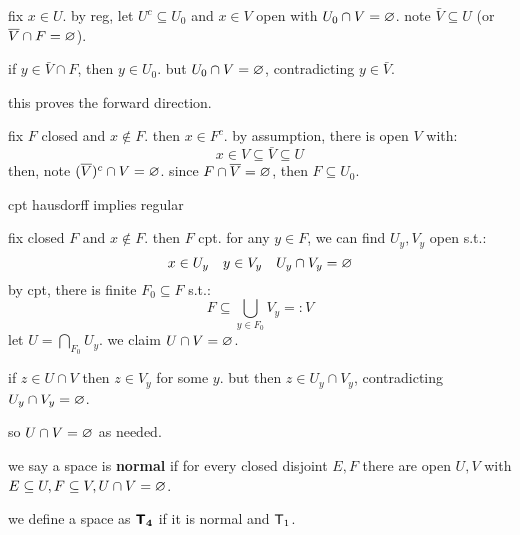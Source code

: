 \begin{pf}[source=Primary Source Material]
    fix $x\in U$.
    by reg, let $U^{c}\subseteq U_{0}$ and $x\in V$ open with
    $U_{0}\cap V=\varnothing$.
    note $\bar{V}\subseteq U$ (or $\overline{V}\cap F=\varnothing$).
    \begin{block}
        if $y\in\bar{V}\cap F$, then $y\in U_{0}$.
        but $U_{0}\cap V=\varnothing$, contradicting $y\in\bar{V}$.
    \end{block}
    this proves the forward direction.

    fix $F$ closed and $x\notin F$. then $x\in F^{c}$.
    by assumption, there is open $V$ with:
    \begin{equation*}
        x\in V\subseteq\bar{V}\subseteq U
    \end{equation*}
    then, note $(\overline{V})^{c}\cap V=\varnothing$.
    since $F\cap\overline{V}=\varnothing$, then $F\subseteq U_{0}$.
\end{pf}

\begin{prop}
    cpt hausdorff implies regular
\end{prop}

\begin{pf}[source=Primary Source Material]
    fix closed $F$ and $x\notin F$. then $F$ cpt.
    for any $y\in F$, we can find $U_{y},V_{y}$ open s.t.:
    \begin{equation*}
        x\in U_{y} \quad y\in V_{y} \quad U_{y}\cap V_{y}=\varnothing
    \end{equation*}
    by cpt, there is finite $F_{0}\subseteq F$ s.t.:
    \begin{equation*}
        F\subseteq \bigcup_{y\in F_{0}}V_{y} =: V
    \end{equation*}
    let $U=\bigcap_{F_{0}}U_{y}$. we claim $U\cap V=\varnothing$.
    \begin{block}
        if $z\in U\cap V$ then $z\in V_{y}$ for some $y$.
        but then $z\in U_{y}\cap V_{y}$, contradicting $U_{y}\cap V_{y}=\varnothing$.
    \end{block}
    so $U\cap V=\varnothing$ as needed.
\end{pf}

\begin{defn}
    we say a space is \textbf{normal} if for every closed disjoint $E,F$ there
    are open $U,V$ with $E\subseteq U,F\subseteq V,U\cap V=\varnothing$.

    we define a space as $\bm{\mathsf{T}_{4}}$ if it is normal and $\mathsf{T}_{1}$.
\end{defn}

